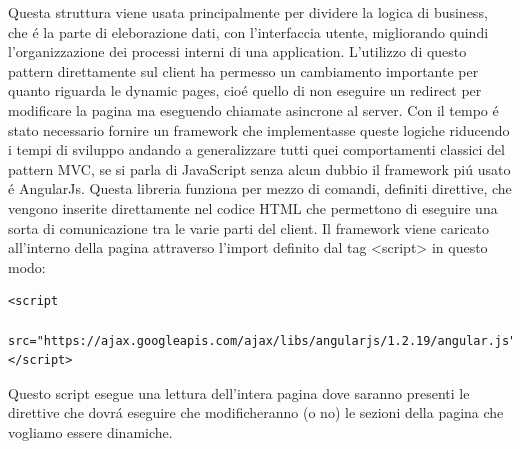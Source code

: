 Questa struttura viene usata principalmente per dividere la logica di business, che \'e la parte di eleborazione dati, con l'interfaccia utente, migliorando quindi l'organizzazione dei processi interni di una application. 
L'utilizzo di questo pattern direttamente sul client ha permesso un cambiamento importante per quanto riguarda le dynamic pages, cio\'e quello di non eseguire un redirect per modificare la pagina ma eseguendo chiamate asincrone al server. 
Con il tempo \'e stato necessario fornire un framework che implementasse queste logiche riducendo i tempi di sviluppo andando a generalizzare tutti quei comportamenti classici del pattern MVC, se si parla di JavaScript senza alcun dubbio il framework pi\'u usato \'e AngularJs.
Questa libreria funziona per mezzo di comandi, definiti direttive, che vengono inserite direttamente nel codice HTML che permettono di eseguire una sorta di comunicazione tra le varie parti del client. Il framework viene caricato all'interno della pagina attraverso l'import definito dal tag <script> in questo modo:
\begin{lstlisting}
<script 
 src="https://ajax.googleapis.com/ajax/libs/angularjs/1.2.19/angular.js">
</script>
\end{lstlisting}
Questo script esegue una lettura dell'intera pagina dove saranno presenti le direttive che dovr\'a eseguire che modificheranno (o no) le sezioni della pagina che vogliamo essere dinamiche.





